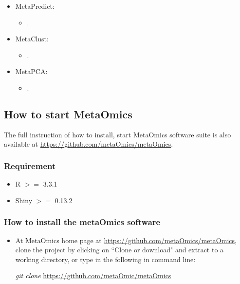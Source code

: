 \begin{itemize}
\item MetaPredict: 
\begin{itemize}
\item {}.
\end{itemize}

\item MetaClust: 
\begin{itemize}
\item {}.
\end{itemize}

\item MetaPCA: 

\begin{itemize}
\item {}.
\end{itemize}

\end{itemize}



\subsection{How to start MetaOmics}

The full instruction of how to install, start MetaOmics software suite is also available at \url{https://github.com/metaOmics/metaOmics}.


\subsubsection{Requirement}
\begin{itemize}
\item R $>=$ 3.3.1
\item Shiny $>=$ 0.13.2
\end{itemize}

\subsubsection{How to install the metaOmics software}
\begin{itemize}
\item At MetaOmics home page at \url{https://github.com/metaOmics/metaOmics}, clone the project by
clicking on ``Clone or download" and extract to a working directory, 
or type in the following in command line:

\textit{git clone} \url{https://github.com/metaOmic/metaOmics}
\end{itemize}

